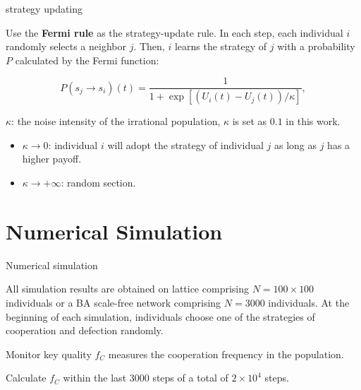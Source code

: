 \documentclass[notheorems,11pt,compress]{beamer}
\numberwithin{figure}{section}
\numberwithin{table}{section}
\numberwithin{equation}{section}
\theoremstyle{plain}
\numberwithin{theorem}{section}
\numberwithin{definition}{section}
\numberwithin{lemma}{section}
\numberwithin{proposition}{section}
\numberwithin{corollary}{section}
\theoremstyle{example}
\begin{document}
\begin{frame}{strategy updating}

	Use the \textbf{Fermi rule} as the strategy-update rule. In each step, each individual $i$ randomly selects a neighbor $j$. Then, $i$ learns the strategy of $j$ with a probability $P$ calculated by the Fermi function:

	\begin{equation}
		P\left(s_j \rightarrow s_i\right)(t)=\frac{1}{1+\exp \left[\left(U_i(t)-U_j(t)\right) / \kappa\right]},
	\end{equation}
	\begin{block}{}
		$\kappa$: the noise intensity of the irrational population, $\kappa$ is set as $0.1$ in this work.
		\begin{itemize}
			\item $\kappa\to0$: individual $i$ will adopt the strategy of individual $j$ as long as $j$ has a higher payoff.
			\item $\kappa\to+\infty$: random section.
		\end{itemize}
	\end{block}
\end{frame}




\section{Numerical Simulation}

\begin{frame}{Numerical simulation}

	All simulation results are obtained on lattice comprising $N = 100 \times 100$ individuals or a BA scale-free network comprising $N = 3000$ individuals. At the beginning of each simulation, individuals choose one of the strategies of cooperation and defection randomly.

	Monitor key quality $f_C$ measures the cooperation frequency in the population.

	Calculate $f_C$ within the last $3000$ steps of a total of $2 \times 10^4$ steps.


\end{frame}


\end{document}
